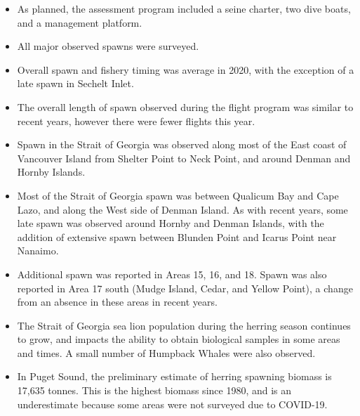 \begin{itemize}

\item As planned, the assessment program included a seine charter, two dive boats, and a management platform.

\item All major observed spawns were surveyed.

\item Overall spawn and fishery timing was average in 2020, with the exception of a late spawn in Sechelt Inlet.

\item The overall length of spawn observed during the flight program was similar to recent years,
however there were fewer flights this year.

\item Spawn in the Strait of Georgia was observed along most of the East coast of Vancouver Island from Shelter Point to Neck Point, and around Denman and Hornby Islands.

\item Most of the Strait of Georgia spawn was between Qualicum Bay and Cape Lazo, and along the West side of Denman Island.
As with recent years, some late spawn was observed around Hornby and Denman Islands,
with the addition of extensive spawn between Blunden Point and Icarus Point near Nanaimo.

\item Additional spawn was reported in Areas 15, 16, and 18.
Spawn was also reported in Area 17 south (Mudge Island, Cedar, and Yellow Point), a change from an absence in these areas in recent years.

\item The Strait of Georgia sea lion population during the herring season continues to grow, and impacts the ability to obtain biological samples in some areas and times.
A small number of Humpback Whales were also observed.

\item In Puget Sound, the preliminary estimate of herring spawning biomass is 17,635 tonnes.
This is the highest biomass since 1980, and is an underestimate because some areas were not surveyed due to COVID-19.

\end{itemize}
